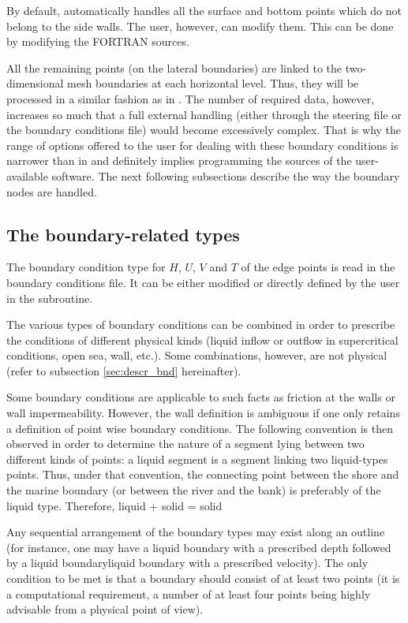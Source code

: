 By default,  automatically handles all the surface and bottom points
which do not belong to the side walls. The user, however, can modify them. This
can be done by modifying the FORTRAN sources.

All the remaining points (on the lateral boundaries) are linked to the
two-dimensional mesh boundaries at each horizontal level. Thus, they will be
processed in a similar fashion as in . The number of required data,
however, increases so much that a full external handling (either through the
steering file or the boundary conditions file) would become excessively
complex. That is why the range of options offered to the user for dealing with
these boundary conditions is narrower than in  and definitely implies
programming the sources of the user-available software. The next following
subsections describe the way the boundary nodes are handled.


\subsection{The boundary-related types}

The boundary condition type for $H$, $U$, $V$ and $T$ of the edge points is
read in the boundary conditions file. It can be either modified or directly
defined by the user in the  subroutine.

The various types of boundary conditions can be combined in order to prescribe
the conditions of different physical kinds (liquid inflow or outflow in
supercritical conditions, open sea, wall, etc.). Some combinations, however,
are not physical (refer to subsection \ref{sec:descr_bnd} hereinafter).

Some boundary conditions are applicable to such facts as friction at the walls
or wall impermeability. However, the wall definition is ambiguous if one only
retains a definition of point wise boundary conditions. The following
convention is then observed in order to determine the nature of a segment lying
between two different kinds of points: a liquid segment is a segment linking
two liquid-types points. Thus, under that convention, the connecting point
between the shore and the marine boundary (or between the river and the bank)
is preferably of the liquid type. Therefore, liquid + solid = solid

Any sequential arrangement of the boundary types may exist along an outline
(for instance, one may have a liquid boundary with a prescribed depth followed
by a liquid boundaryliquid boundary with a prescribed velocity). The only
condition to be met is that a boundary should consist of at least two points
(it is a computational requirement, a number of at least four points being
highly advisable from a physical point of view).


